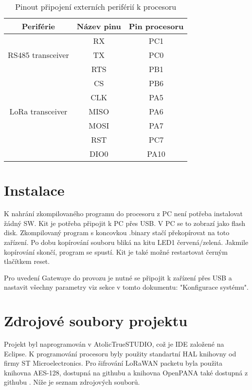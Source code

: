 \begin{table}[h]
    \centering
    \begin{tabular}{ |c|c|c| }
     \hline

     Periférie          & Název pinu & Pin procesoru           \\ \hline \hline
     
                        & RX  &   PC1            \\
    RS485 transceiver   & TX  &   PC0       \\
                        & RTS  &  PB1      \\     \hline

                        & CS    &  PB6             \\
                        & CLK   &  PA5        \\
   LoRa transceiver     & MISO  &  PA6     \\
                        & MOSI  &  PA7        \\
                        & RST   & PC7          \\
                        & DIO0  & PA10         \\
                        \hline

    \end{tabular}
    \caption{Pinout připojení externích periférií k procesoru}
    \label{table:3}
\end{table}


\section{Instalace}
K nahrání zkompilovaného programu do procesoru z PC není potřeba instalovat žádný SW. 
Kit je potřeba připojit k PC přes USB. V PC se to zobrazí jako flash disk. Zkompilovaný program s koncovkou .binary stačí překopírovat na toto zařízení. Po dobu kopírování souboru bliká na kitu LED1 červená/zelená. Jakmile kopírování skončí, program se spustí. Kit je také možné restartovat černým tlačítkem reset.

 Pro uvedení Gatewaye do provozu je nutné se připojit k zařízení přes USB a nastavit všechny parametry viz sekce v tomto dokumentu: "Konfigurace systému".

\newpage
\section{Zdrojové soubory projektu}
Projekt byl naprogramován v AtolicTrueSTUDIO, což je IDE založené na Eclipse. 
K programování procesoru byly použity standartní HAL knihovny od firmy ST Microelectronics.
Pro šifrování LoRaWAN packetu byla použita knihovna AES-128, dostupná na githubu \cite{AESlib} a knihovna OpenPANA také dostupná z githubu \cite{CMAClib}.
Níže je seznam zdrojových souborů.

